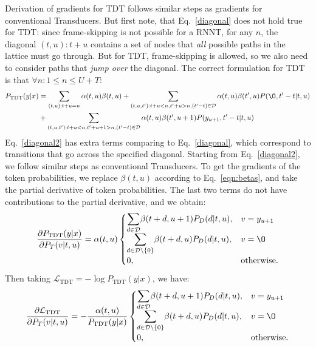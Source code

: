 \documentclass{article}
\begin{document}
Derivation of gradients for TDT follows similar steps as gradients for conventional Transducers. But first note, that Eq.~\ref{diagonal} does not hold true for TDT: since frame-skipping is not possible for a RNNT, for any $n$, the diagonal $(t, u): t + u$ contains a set of nodes that \emph{all} possible paths in the lattice must go through. But for TDT, frame-skipping is allowed, so we also need to consider paths that \emph{jump over} the diagonal. The correct formulation for TDT is that $\forall n: 1 \leq n \leq U + T$: 
\begin{equation}
\label{diagonal2}
\begin{aligned}
        P_\text{TDT}(y|x) & = \sum_{(t,u): t + u =n} \alpha(t, u) \beta(t, u) 
         + \sum_{(t,u,t'): t+u < n, t'+u > n, (t'-t) \in \mathcal{D}} \alpha(t, u) \beta(t', u) P(\O, t'-t | t, u) \\
        & + \sum_{(t,u,t'): t+u < n, t'+u+1 > n, (t'-t) \in \mathcal{D}} \alpha(t, u) \beta(t', u+1) P(y_{u+1}, t'-t | t, u)
\end{aligned}
\end{equation}
Eq.~\ref{diagonal2} has extra terms comparing to Eq.~\ref{diagonal}, which correspond to transitions that go across the specified diagonal.
Starting from Eq.~\ref{diagonal2}, we follow similar steps as conventional Transducers.
To get the gradients of the token probabilities, we replace $\beta(t, u)$ according to 
Eq.~\ref{eqn:betas},  and take the partial derivative of token probabilities. The last two terms do not have contributions to the partial derivative, and we obtain:
\begin{equation} 
    \label{tdt_p_gradient}
    \frac{\partial P_\text{TDT}(y|x)}{\partial P_T(v|t, u)} = \alpha(t,u)  \begin{cases}
        \mathlarger\sum\limits_{d\in \mathcal{D}} \beta(t+d,u+1) P_D(d | t, u),  & v = y_{u+1} \\
        \mathlarger\sum\limits_{d\in \mathcal{D} \setminus{\{0\} }} \beta(t+d,u) P_D(d| t, u),  & v = \O \\
        0,             & \text{otherwise.} \\
    \end{cases}
\end{equation}
Then taking $\mathcal{L}_\text{TDT} =  -\log P_\text{TDT}(y | x)$, we have:
\begin{equation} 
    \label{tdt_gradient_token_all}
    \frac{\partial \mathcal{L}_\text{TDT}}{\partial P_T(v|t, u)} = -\frac{\alpha(t,u) }{P_\text{TDT}(y|x)} \begin{cases}
        \mathlarger\sum\limits_{d\in \mathcal{D}} \beta(t+d,u+1) P_D(d | t, u),  & v = y_{u+1} \\
        \mathlarger\sum\limits_{d\in \mathcal{D} \setminus{\{0\} }} \beta(t+d,u) P_D(d| t, u),  & v = \O \\
        0,             & \text{otherwise.} \\
    \end{cases}
\end{equation}
\end{document}
